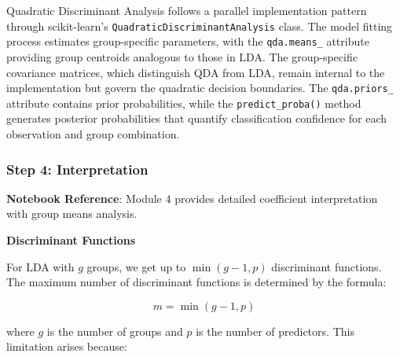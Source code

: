\documentclass[
]{article}
\begin{document}
\begin{Shaded}
\begin{Highlighting}[]

\OperatorTok{=}
\end{Highlighting}
\end{Shaded}

Quadratic Discriminant Analysis follows a parallel implementation
pattern through scikit-learn's \texttt{Quadratic\allowbreak{}Discriminant\allowbreak{}Analysis}
class. The model fitting process estimates group-specific parameters,
with the \texttt{qda.means\_} attribute providing group centroids
analogous to those in LDA. The group-specific covariance matrices, which
distinguish QDA from LDA, remain internal to the implementation but
govern the quadratic decision boundaries. The \texttt{qda.priors\_}
attribute contains prior probabilities, while the
\texttt{predict\_proba()} method generates posterior probabilities that
quantify classification confidence for each observation and group
combination.

\begin{Shaded}
\begin{Highlighting}[]

\OperatorTok{=}
\end{Highlighting}
\end{Shaded}

\subsubsection{Step 4: Interpretation}

\textbf{Notebook Reference}: Module 4 provides detailed coefficient
interpretation with group means analysis.

\textbf{Discriminant Functions}

For LDA with \(g\) groups, we get up to \(\min(g - 1,p)\) discriminant
functions. The maximum number of discriminant functions is determined by
the formula:

\[m = \min(g - 1,p)\]

where \(g\) is the number of groups and \(p\) is the number of
predictors. This limitation arises because:
\end{document}

